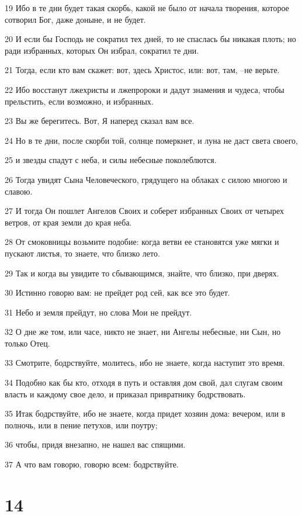 \par 19 Ибо в те дни будет такая скорбь, какой не было от начала творения, которое сотворил Бог, даже доныне, и не будет.
\par 20 И если бы Господь не сократил тех дней, то не спаслась бы никакая плоть; но ради избранных, которых Он избрал, сократил те дни.
\par 21 Тогда, если кто вам скажет: вот, здесь Христос, или: вот, там, --не верьте.
\par 22 Ибо восстанут лжехристы и лжепророки и дадут знамения и чудеса, чтобы прельстить, если возможно, и избранных.
\par 23 Вы же берегитесь. Вот, Я наперед сказал вам все.
\par 24 Но в те дни, после скорби той, солнце померкнет, и луна не даст света своего,
\par 25 и звезды спадут с неба, и силы небесные поколеблются.
\par 26 Тогда увидят Сына Человеческого, грядущего на облаках с силою многою и славою.
\par 27 И тогда Он пошлет Ангелов Своих и соберет избранных Своих от четырех ветров, от края земли до края неба.
\par 28 От смоковницы возьмите подобие: когда ветви ее становятся уже мягки и пускают листья, то знаете, что близко лето.
\par 29 Так и когда вы увидите то сбывающимся, знайте, что близко, при дверях.
\par 30 Истинно говорю вам: не прейдет род сей, как все это будет.
\par 31 Небо и земля прейдут, но слова Мои не прейдут.
\par 32 О дне же том, или часе, никто не знает, ни Ангелы небесные, ни Сын, но только Отец.
\par 33 Смотрите, бодрствуйте, молитесь, ибо не знаете, когда наступит это время.
\par 34 Подобно как бы кто, отходя в путь и оставляя дом свой, дал слугам своим власть и каждому свое дело, и приказал привратнику бодрствовать.
\par 35 Итак бодрствуйте, ибо не знаете, когда придет хозяин дома: вечером, или в полночь, или в пение петухов, или поутру;
\par 36 чтобы, придя внезапно, не нашел вас спящими.
\par 37 А что вам говорю, говорю всем: бодрствуйте.

\chapter{14}

